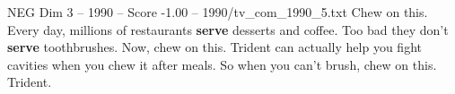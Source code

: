 \begin{textsample}{NEG Dim 3 – 1990 – Score -1.00 – 1990/tv\_com\_1990\_5.txt}  \label{ex:f3_neg_024}
Chew on this.
Every day, millions of restaurants \textbf{serve} desserts and coffee.
Too bad they don't \textbf{serve} toothbrushes.
Now, chew on this.
Trident can actually help you fight cavities when you chew it after meals.
So when you can't brush, chew on this.
Trident.

\end{textsample}
